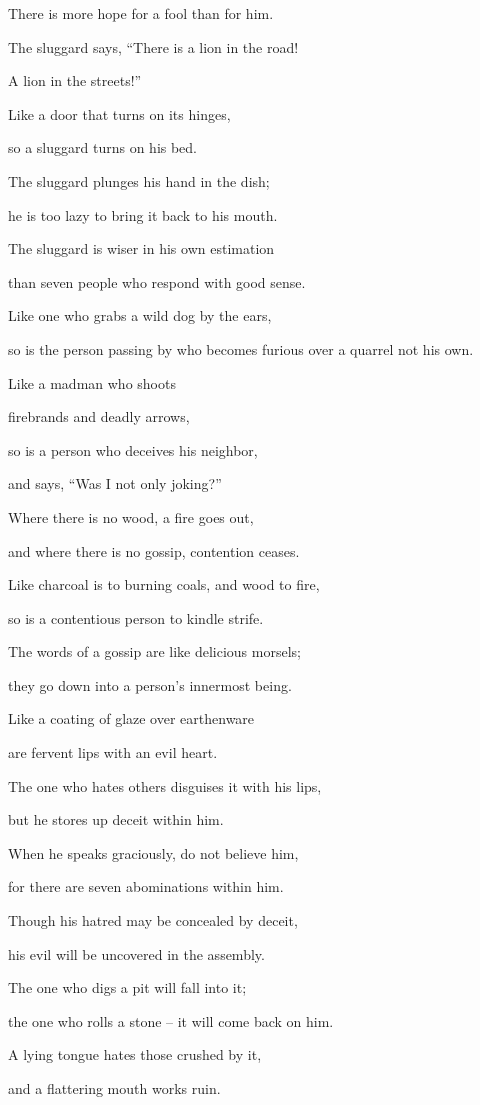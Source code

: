 {\par }{\Q There is more hope
for a fool
than for him.
\par }{\Q {}The sluggard
says, “There is a lion
in the road!
\par }{\Q A lion
in the streets!”
\par }{\Q {}Like a door
that turns
on
its hinges,
\par }{\Q so a sluggard
turns on
his bed.
\par }{\Q {}The sluggard
plunges
his hand
in the dish;
\par }{\Q he is too lazy
to bring it back
to
his mouth.
\par }{\Q {}The sluggard
is wiser
in his own estimation
\par }{\Q than seven
people who respond
with good sense.
\par }{\Q {}Like one who grabs
a wild dog
by the ears,
\par }{\Q so is the person passing
by who becomes furious over
a quarrel
not his own.
\par }{\Q {}Like a madman
who shoots
\par }{\Q firebrands
and deadly
arrows,
\par }{\Q {}so
is a person
who deceives
his neighbor,
\par }{\Q and says,
“Was I
not
only joking?”
\par }{\Q {}Where there is no wood,
a fire
goes out,
\par }{\Q and where there is no
gossip,
contention
ceases.
\par }{\Q {}Like charcoal
is to burning coals,
and wood
to fire,
\par }{\Q so is a contentious
person
to kindle
strife.
\par }{\Q {}The words
of a gossip
are like delicious morsels;
\par }{\Q they
go down
into a person’s innermost being.
\par }{\Q {}Like a coating of glaze
over earthenware
\par }{\Q are
fervent
lips
with an
evil
heart.
\par }{\Q {}The one who hates
others disguises
it with his lips,
\par }{\Q but he stores up deceit
within him.
\par }{\Q {}When
he speaks
graciously,
do not
believe
him,

\par }{\Q for
there are seven
abominations within him.
\par }{\Q {}Though his hatred
may be concealed
by deceit,
\par }{\Q his evil
will be uncovered
in the assembly.
\par }{\Q {}The one who digs
a pit
will fall
into it;
\par }{\Q the one who rolls
a stone
– it will come back on him.
\par }{\Q {}A lying
tongue
hates
those crushed
by it,
\par }{\Q and a flattering
mouth
works
ruin.

}
